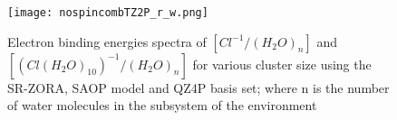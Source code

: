 \documentclass[a4paper,11pt]{report}
\begin{document}
\begin{figure}[H]\large
\texttt{[image: nospincombTZ2P\_r\_w.png]}
\caption{Electron binding energies spectra of $[Cl^{-1}/(H_{2}O)_{n}]$ and $[(Cl(H_{2}O)_{10})^{-1}/(H_{2}O)_{n}]$ for various cluster size using the SR-ZORA, SAOP model and QZ4P basis set; where n is the number of water molecules in the subsystem of the environment}
\label{figure51}
\end{figure}


\end{document}
